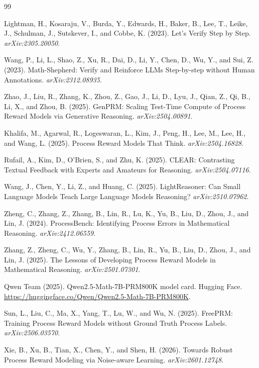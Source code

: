 \documentclass{article}
\begin{document}
\begin{thebibliography}{99}

 Lightman, H., Kosaraju, V., Burda, Y., Edwards,
H., Baker, B., Lee, T., Leike, J., Schulman, J., Sutskever, I., and Cobbe, K.
(2023). Let's Verify Step by Step. \emph{arXiv:2305.20050}.

 Wang, P., Li, L., Shao, Z., Xu, R., Dai, D.,
Li, Y., Chen, D., Wu, Y., and Sui, Z. (2023). Math-Shepherd: Verify and
Reinforce LLMs Step-by-step without Human Annotations. \emph{arXiv:2312.08935}.

 Zhao, J., Liu, R., Zhang, K., Zhou, Z., Gao, J.,
Li, D., Lyu, J., Qian, Z., Qi, B., Li, X., and Zhou, B. (2025). GenPRM:
Scaling Test-Time Compute of Process Reward Models via Generative Reasoning.
\emph{arXiv:2504.00891}.

 Khalifa, M., Agarwal, R., Logeswaran, L.,
Kim, J., Peng, H., Lee, M., Lee, H., and Wang, L. (2025). Process Reward
Models That Think. \emph{arXiv:2504.16828}.

 Rufail, A., Kim, D., O'Brien, S., and Zhu, K.
(2025). CLEAR: Contrasting Textual Feedback with Experts and Amateurs for
Reasoning. \emph{arXiv:2504.07116}.

 Wang, J., Chen, Y., Li, Z., and Huang, C.
(2025). LightReasoner: Can Small Language Models Teach Large Language
Models Reasoning? \emph{arXiv:2510.07962}.

 Zheng, C., Zhang, Z., Zhang, B., Lin, R.,
Lu, K., Yu, B., Liu, D., Zhou, J., and Lin, J. (2024). ProcessBench:
Identifying Process Errors in Mathematical Reasoning. \emph{arXiv:2412.06559}.

 Zhang, Z., Zheng, C., Wu, Y., Zhang, B.,
Lin, R., Yu, B., Liu, D., Zhou, J., and Lin, J. (2025). The Lessons of
Developing Process Reward Models in Mathematical Reasoning.
\emph{arXiv:2501.07301}.

 Qwen Team (2025). Qwen2.5-Math-7B-PRM800K
model card. Hugging Face.
\url{https://huggingface.co/Qwen/Qwen2.5-Math-7B-PRM800K}.

 Sun, L., Liu, C., Ma, X., Yang, T., Lu, W., and
Wu, N. (2025). FreePRM: Training Process Reward Models without Ground
Truth Process Labels. \emph{arXiv:2506.03570}.

 Xie, B., Xu, B., Tian, X., Chen, Y., and Shen,
H. (2026). Towards Robust Process Reward Modeling via Noise-aware Learning.
\emph{arXiv:2601.12748}.


\end{thebibliography}
\end{document}
